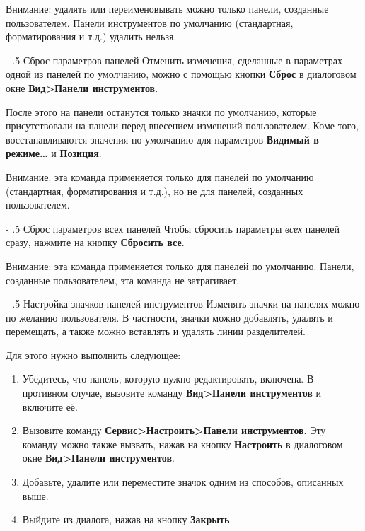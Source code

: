 ﻿\documentclass[a4paper,10pt]{article}
\makeatletter
\renewcommand\paragraph{%
   \@startsection{paragraph}{4}{0mm}%
      {-\baselineskip}%
      {.5\baselineskip}%
      {\normalfont\normalsize\bfseries}}
\makeatother
\begin{document}
 Внимание: удалять или переименовывать можно только панели, созданные пользователем. Панели инструментов по умолчанию (стандартная, форматирования и т.д.) удалить нельзя.
 
 \paragraph{Сброс параметров панелей}
 Отменить изменения, сделанные в параметрах одной из панелей по умолчанию, можно с помощью кнопки \textbf{Сброс} в диалоговом окне \textbf{Вид>Панели инструментов}.
 
 После этого на панели останутся только значки по умолчанию, которые присутствовали на панели перед внесением изменений пользователем. Коме того, восстанавливаются значения по умолчанию для параметров \textbf{Видимый в режиме…} и \textbf{Позиция}.
 
 Внимание: эта команда применяется только для панелей по умолчанию (стандартная, форматирования и т.д.), но не для панелей, созданных пользователем.
 
 \paragraph{Сброс параметров всех панелей}
 Чтобы сбросить параметры \textit{всех} панелей сразу, нажмите на кнопку \textbf{Сбросить все}.
 
 Внимание: эта команда применяется только для панелей по умолчанию. Панели, созданные пользователем, эта команда не затрагивает.
 
 \paragraph{Настройка значков панелей инструментов}
 Изменять значки на панелях можно по желанию пользователя. В частности, значки можно добавлять, удалять и перемещать, а также можно вставлять и удалять линии разделителей.
 
 Для этого нужно выполнить следующее:
 
 \begin{enumerate}
  \item Убедитесь, что панель, которую нужно редактировать, включена. В противном случае, вызовите команду \textbf{Вид>Панели инструментов} и включите её.
  \item Вызовите команду \textbf{Сервис>Настроить>Панели инструментов}. Эту команду можно также вызвать, нажав на кнопку \textbf{Настроить} в диалоговом окне \textbf{Вид>Панели инструментов}.
  \item Добавьте, удалите или переместите значок одним из способов, описанных выше.
  \item Выйдите из диалога, нажав на кнопку \textbf{Закрыть}.
 \end{enumerate}
\end{document}
